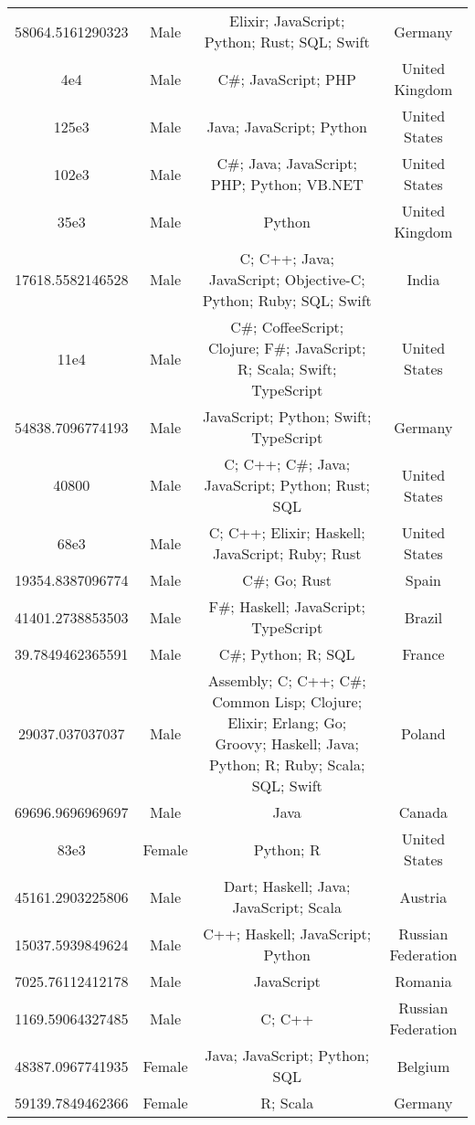 \begin{center}
\begin{tabular}{ |c|c|c|c| }
58064.5161290323  &  Male  &  Elixir; JavaScript; Python; Rust; SQL; Swift  &  Germany  \\ 
4e4  &  Male  &  C\#; JavaScript; PHP  &  United Kingdom  \\ 
125e3  &  Male  &  Java; JavaScript; Python  &  United States  \\ 
102e3  &  Male  &  C\#; Java; JavaScript; PHP; Python; VB.NET  &  United States  \\ 
35e3  &  Male  &  Python  &  United Kingdom  \\ 
17618.5582146528  &  Male  &  C; C++; Java; JavaScript; Objective-C; Python; Ruby; SQL; Swift  &  India  \\ 
11e4  &  Male  &  C\#; CoffeeScript; Clojure; F\#; JavaScript; R; Scala; Swift; TypeScript  &  United States  \\ 
54838.7096774193  &  Male  &  JavaScript; Python; Swift; TypeScript  &  Germany  \\ 
40800  &  Male  &  C; C++; C\#; Java; JavaScript; Python; Rust; SQL  &  United States  \\ 
68e3  &  Male  &  C; C++; Elixir; Haskell; JavaScript; Ruby; Rust  &  United States  \\ 
19354.8387096774  &  Male  &  C\#; Go; Rust  &  Spain  \\ 
41401.2738853503  &  Male  &  F\#; Haskell; JavaScript; TypeScript  &  Brazil  \\ 
39.7849462365591  &  Male  &  C\#; Python; R; SQL  &  France  \\ 
29037.037037037  &  Male  &  Assembly; C; C++; C\#; Common Lisp; Clojure; Elixir; Erlang; Go; Groovy; Haskell; Java; Python; R; Ruby; Scala; SQL; Swift  &  Poland  \\ 
69696.9696969697  &  Male  &  Java  &  Canada  \\ 
83e3  &  Female  &  Python; R  &  United States  \\ 
45161.2903225806  &  Male  &  Dart; Haskell; Java; JavaScript; Scala  &  Austria  \\ 
15037.5939849624  &  Male  &  C++; Haskell; JavaScript; Python  &  Russian Federation  \\ 
7025.76112412178  &  Male  &  JavaScript  &  Romania  \\ 
1169.59064327485  &  Male  &  C; C++  &  Russian Federation  \\ 
48387.0967741935  &  Female  &  Java; JavaScript; Python; SQL  &  Belgium  \\ 
59139.7849462366  &  Female  &  R; Scala  &  Germany  \\ 

\end{tabular}
\end{center}
